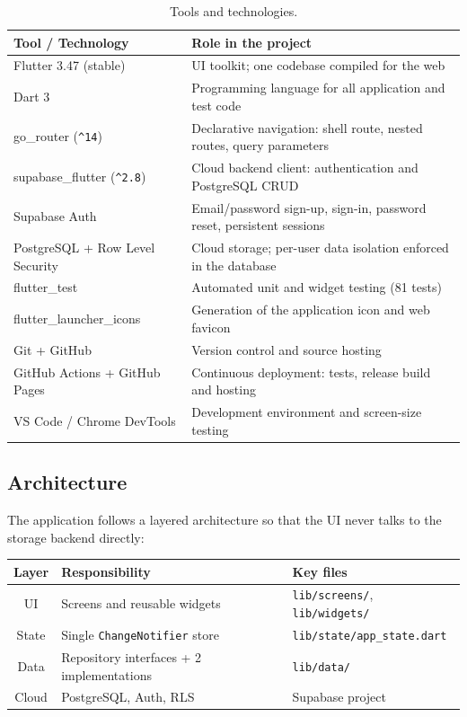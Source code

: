 \documentclass[12pt,a4paper]{article}
\begin{document}
\begin{table}[H]
\centering
\begin{tabularx}{\textwidth}{lX}
\toprule
\textbf{Tool / Technology} & \textbf{Role in the project} \\
\midrule
Flutter 3.47 (stable) & UI toolkit; one codebase compiled for the web \\
Dart 3 & Programming language for all application and test code \\
go\_router (\texttt{\^{}14}) & Declarative navigation: shell route, nested routes, query parameters \\
supabase\_flutter (\texttt{\^{}2.8}) & Cloud backend client: authentication and PostgreSQL CRUD \\
Supabase Auth & Email/password sign-up, sign-in, password reset, persistent sessions \\
PostgreSQL + Row Level Security & Cloud storage; per-user data isolation enforced in the database \\
flutter\_test & Automated unit and widget testing (81 tests) \\
flutter\_launcher\_icons & Generation of the application icon and web favicon \\
Git + GitHub & Version control and source hosting \\
GitHub Actions + GitHub Pages & Continuous deployment: tests, release build and hosting \\
VS Code / Chrome DevTools & Development environment and screen-size testing \\
\bottomrule
\end{tabularx}
\caption{Tools and technologies.}
\end{table}

\subsection{Architecture}
The application follows a layered architecture so that the UI never talks
to the storage backend directly:

\begin{center}
\begin{tabular}{c l l}
\toprule
Layer & Responsibility & Key files \\
\midrule
UI & Screens and reusable widgets & \texttt{lib/screens/}, \texttt{lib/widgets/} \\
State & Single \texttt{ChangeNotifier} store & \texttt{lib/state/app\_state.dart} \\
Data & Repository interfaces + 2 implementations & \texttt{lib/data/} \\
Cloud & PostgreSQL, Auth, RLS & Supabase project \\
\bottomrule
\end{tabular}
\end{center}
\end{document}
